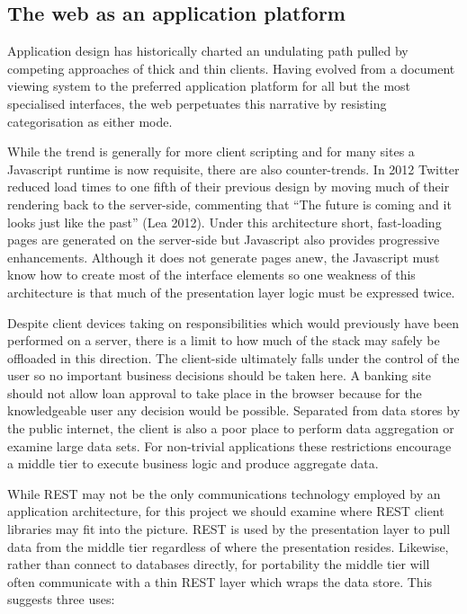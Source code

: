 \documentclass[12pt, ]{article}
\begin{document}
\subsection{The web as an application
platform}\label{the-web-as-an-application-platform}

Application design has historically charted an undulating path pulled by
competing approaches of thick and thin clients. Having evolved from a
document viewing system to the preferred application platform for all
but the most specialised interfaces, the web perpetuates this narrative
by resisting categorisation as either mode.

While the trend is generally for more client scripting and for many
sites a Javascript runtime is now requisite, there are also
counter-trends. In 2012 Twitter reduced load times to one fifth of their
previous design by moving much of their rendering back to the
server-side, commenting that ``The future is coming and it looks just
like the past'' (Lea 2012). Under this architecture short, fast-loading
pages are generated on the server-side but Javascript also provides
progressive enhancements. Although it does not generate pages anew, the
Javascript must know how to create most of the interface elements so one
weakness of this architecture is that much of the presentation layer
logic must be expressed twice.

Despite client devices taking on responsibilities which would previously
have been performed on a server, there is a limit to how much of the
stack may safely be offloaded in this direction. The client-side
ultimately falls under the control of the user so no important business
decisions should be taken here. A banking site should not allow loan
approval to take place in the browser because for the knowledgeable user
any decision would be possible. Separated from data stores by the public
internet, the client is also a poor place to perform data aggregation or
examine large data sets. For non-trivial applications these restrictions
encourage a middle tier to execute business logic and produce aggregate
data.

While REST may not be the only communications technology employed by an
application architecture, for this project we should examine where REST
client libraries may fit into the picture. REST is used by the
presentation layer to pull data from the middle tier regardless of where
the presentation resides. Likewise, rather than connect to databases
directly, for portability the middle tier will often communicate with a
thin REST layer which wraps the data store. This suggests three uses:
\end{document}
